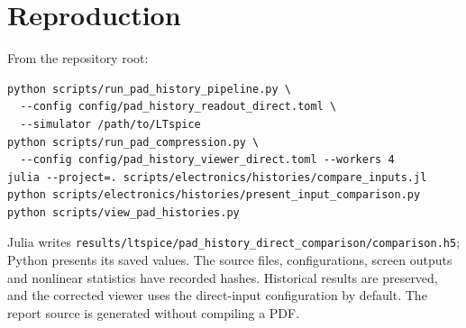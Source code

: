 \documentclass[11pt,a4paper]{article}
\begin{document}
\section{Reproduction}
From the repository root:
\begin{verbatim}
python scripts/run_pad_history_pipeline.py \
  --config config/pad_history_readout_direct.toml \
  --simulator /path/to/LTspice
python scripts/run_pad_compression.py \
  --config config/pad_history_viewer_direct.toml --workers 4
julia --project=. scripts/electronics/histories/compare_inputs.jl
python scripts/electronics/histories/present_input_comparison.py
python scripts/view_pad_histories.py
\end{verbatim}
Julia writes \texttt{results/ltspice/pad\_history\_direct\_comparison/comparison.h5};
Python presents its saved values. The source files, configurations, screen
outputs and nonlinear statistics have recorded hashes. Historical results are
preserved, and the corrected viewer uses the direct-input configuration by
default. The report source is generated without compiling a PDF.
\end{document}
